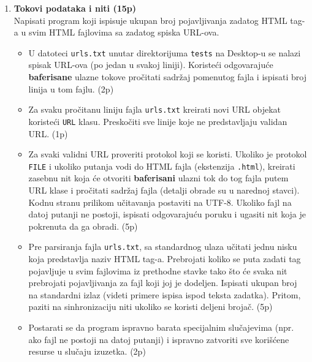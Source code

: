 \documentclass[]{article}
\begin{document}
\begin{enumerate}

\item \textbf{Tokovi podataka i niti (15p)}
\\Napisati program koji ispisuje ukupan broj pojavljivanja zadatog HTML tag-a u svim HTML fajlovima sa zadatog spiska URL-ova. 
\begin{itemize}
  \item U datoteci \texttt{urls.txt} unutar direktorijuma \texttt{tests} na Desktop-u se nalazi spisak URL-ova (po jedan u svakoj liniji). Koriste\'c{}i odgovaraju\'c{}e \textbf{baferisane} ulazne tokove pro\v{c}itati sadr\v{z}aj pomenutog fajla i ispisati broj linija u tom fajlu. \hfill (2p)
  \item Za svaku pro\v{c}itanu liniju fajla \texttt{urls.txt} kreirati novi URL objekat koriste\'c{}i \texttt{URL} klasu. Presko\v{c}iti sve linije koje ne predstavljaju validan URL. \hfill (1p)
  \item Za svaki validni URL proveriti protokol koji se koristi. Ukoliko je protokol \texttt{FILE} i ukoliko putanja vodi do HTML fajla (ekstenzija \texttt{.html}), kreirati zasebnu nit koja \'c{}e otvoriti \textbf{baferisani} ulazni tok do tog fajla putem URL klase i pro\v{c}itati sadr\v{z}aj fajla (detalji obrade su u narednoj stavci). Kodnu stranu prilikom u\v{c}itavanja postaviti na UTF-8. Ukoliko fajl na datoj putanji ne postoji, ispisati odgovaraju\'c{}u poruku i ugasiti nit koja je pokrenuta da ga obradi. \hfill (5p)
  \item Pre parsiranja fajla \texttt{urls.txt}, sa standardnog ulaza u\v{c}itati jednu nisku koja predstavlja naziv HTML tag-a. Prebrojati koliko se puta zadati tag pojavljuje u svim fajlovima iz prethodne stavke tako \v{s}to \'c{}e svaka nit prebrojati pojavljivanja za fajl koji joj je dodeljen. Ispisati ukupan broj na standardni izlaz (videti primere ispisa ispod teksta zadatka). Pritom, paziti na sinhronizaciju niti ukoliko se koristi deljeni broja\v{c}. \hfill (5p)
  \item Postarati se da program ispravno barata specijalnim slu\v{c}ajevima (npr. ako fajl ne postoji na datoj putanji) i ispravno zatvoriti sve kori\v{s}\'c{}ene resurse u slu\v{c}aju izuzetka. \hfill (2p)
\end{itemize}


\end{enumerate}
\end{document}
